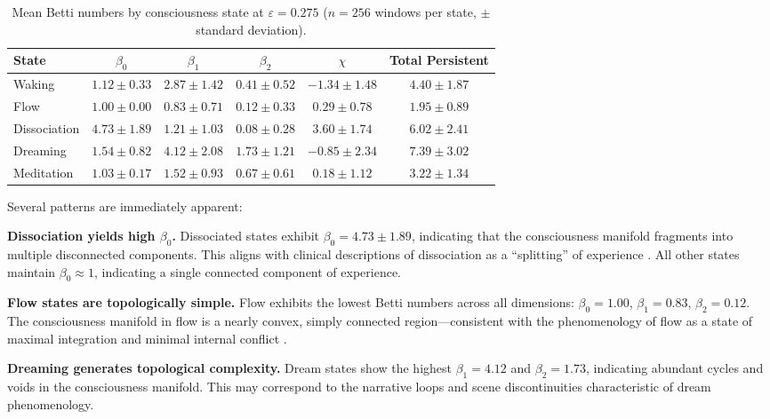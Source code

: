 \documentclass[11pt,a4paper]{article}
\begin{document}
\begin{table}[h]
\centering
\caption{Mean Betti numbers by consciousness state at $\varepsilon = 0.275$ ($n = 256$ windows per state, $\pm$ standard deviation).}
\label{tab:betti}
\begin{tabular}{lccccc}
\toprule
\textbf{State} & $\beta_0$ & $\beta_1$ & $\beta_2$ & $\chi$ & \textbf{Total Persistent} \\
\midrule
Waking       & $1.12 \pm 0.33$ & $2.87 \pm 1.42$ & $0.41 \pm 0.52$ & $-1.34 \pm 1.48$ & $4.40 \pm 1.87$ \\
Flow         & $1.00 \pm 0.00$ & $0.83 \pm 0.71$ & $0.12 \pm 0.33$ & $0.29 \pm 0.78$  & $1.95 \pm 0.89$ \\
Dissociation & $4.73 \pm 1.89$ & $1.21 \pm 1.03$ & $0.08 \pm 0.28$ & $3.60 \pm 1.74$  & $6.02 \pm 2.41$ \\
Dreaming     & $1.54 \pm 0.82$ & $4.12 \pm 2.08$ & $1.73 \pm 1.21$ & $-0.85 \pm 2.34$ & $7.39 \pm 3.02$ \\
Meditation   & $1.03 \pm 0.17$ & $1.52 \pm 0.93$ & $0.67 \pm 0.61$ & $0.18 \pm 1.12$  & $3.22 \pm 1.34$ \\
\bottomrule
\end{tabular}
\end{table}

Several patterns are immediately apparent:

\textbf{Dissociation yields high $\beta_0$.}
Dissociated states exhibit $\beta_0 = 4.73 \pm 1.89$, indicating that the consciousness manifold fragments into multiple disconnected components.
This aligns with clinical descriptions of dissociation as a ``splitting'' of experience \citep{van2006structural}.
All other states maintain $\beta_0 \approx 1$, indicating a single connected component of experience.

\textbf{Flow states are topologically simple.}
Flow exhibits the lowest Betti numbers across all dimensions: $\beta_0 = 1.00$, $\beta_1 = 0.83$, $\beta_2 = 0.12$.
The consciousness manifold in flow is a nearly convex, simply connected region---consistent with the phenomenology of flow as a state of maximal integration and minimal internal conflict \citep{csikszentmihalyi1990flow}.

\textbf{Dreaming generates topological complexity.}
Dream states show the highest $\beta_1 = 4.12$ and $\beta_2 = 1.73$, indicating abundant cycles and voids in the consciousness manifold.
This may correspond to the narrative loops and scene discontinuities characteristic of dream phenomenology.
\end{document}
